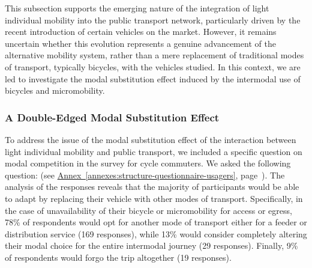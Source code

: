 \begin{refsegment}
This subsection supports the emerging nature of the integration of light individual mobility into the public transport network, particularly driven by the recent introduction of certain vehicles on the market. However, it remains uncertain whether this evolution represents a genuine advancement of the alternative mobility system, rather than a mere replacement of traditional modes of transport, typically bicycles, with the vehicles studied. In this context, we are led to investigate the modal substitution effect induced by the intermodal use of bicycles and micromobility.%

\subsubsection*{A Double-Edged Modal Substitution Effect
    \label{chap4:substitution-modale-double-tranchant}
    }

To address the issue of the modal substitution effect of the interaction between light individual mobility and public transport, we included a specific question on modal competition in the survey for cycle commuters. We asked the following question:  (see \hyperref[annexes:structure-questionnaire-usagers]{Annex~\ref{annexes:structure-questionnaire-usagers}}, page~\pageref{annexes:structure-questionnaire-usagers}). The analysis of the responses reveals that the majority of participants would be able to adapt by replacing their vehicle with other modes of transport. Specifically, in the case of unavailability of their bicycle or micromobility for access or egress, 78\% of respondents would opt for another mode of transport either for a feeder or distribution service (169 responses), while 13\% would consider completely altering their modal choice for the entire intermodal journey (29 responses). Finally, 9\% of respondents would forgo the trip altogether (19 responses). %


\end{refsegment}
